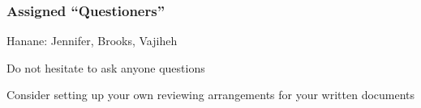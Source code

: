 \documentclass[t,12pt,numbers,fleqn]{beamer}
\begin{document}
\begin{frame}
\frametitle{Assigned ``Questioners''}

\be
\item Hanane: Jennifer, Brooks, Vajiheh
\ee
\bi
\item Do not hesitate to ask anyone questions
\item Consider setting up your own reviewing arrangements for your written
  documents
\ei
\end{frame}

\end{document}
